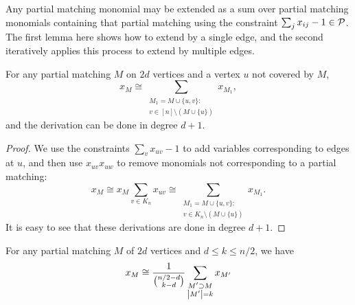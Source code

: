 Any partial matching monomial may be extended as a sum over partial matching monomials containing that partial matching using the constraint $\sum_j x_{ij} - 1 \in \mathcal P$. The first lemma here shows how to extend by a single edge, and the second iteratively applies this process to extend by multiple edges.
\begin{lemma}
  \label{lem:matching+a}
  For any partial matching \(M\) on \(2d\) vertices
  and a vertex \(u\) not covered by \(M\),
  \begin{equation}
    \label{eq:matching+a}
    x_{M}
    \cong
    \sum_{\substack{M_{1} = M \cup \{u,v\}: \\
        v \in [n] \setminus (M \cup \{u\})}}
    x_{M_{1}}
    ,
  \end{equation}
	and the derivation can be done in degree $d+1$.
\end{lemma}
\begin{proof}
We use the constraints \(\sum_{v} x_{uv} - 1\)
to add variables corresponding to edges at \(u\),
and then use \(x_{uv} x_{uw}\) to remove monomials
not corresponding to a partial matching:
\begin{equation*}
  x_{M}
  \cong
  x_{M} \sum_{v \in K_n} x_{uv}
  \cong
  \sum_{\substack{M_{1} = M \cup \{u,v\}: \\
      v \in K_{n} \setminus (M \cup \{u\})}}
  x_{M_{1}}
  .
\end{equation*}
It is easy to see that these derivations are done in degree $d+1$.
\end{proof}
\begin{lemma}
  \label{lem:partial-matching}
  For any partial matching \(M\) of \(2d\) vertices
  and \(d \leq k \leq n/2\),
  we have
  \begin{equation}
    \label{eq:partial-matching}
    x_{M} \cong
    \frac{1}{\binom{n/2 - d}{k - d}}
    \sum_{\substack{M' \supset M \\ \left|M'\right| = k}} x_{M'}
  \end{equation}
\end{lemma}
